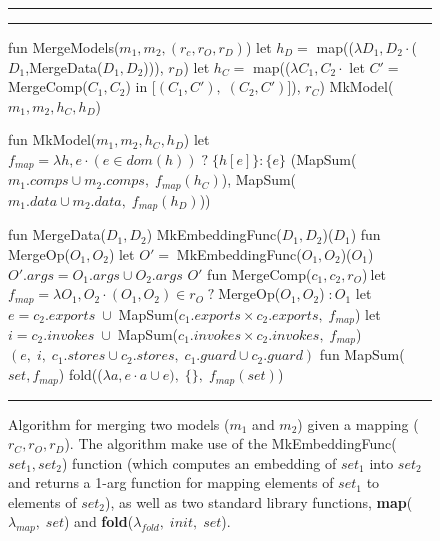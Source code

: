 
\begin{figure}[ht]
\hrule\hrule
\centering
  \begin{slangmath}[numbers=left,emph={MergeModels, MkMap, MkModel,%
                    MergeData, MergeComp, MergeOp, MapSum}]
fun MergeModels($m_1, m_2, (r_c,r_O,r_D)$)
  let $h_D=$ map(($\lambda D_1,D_2 \cdot$($D_1$,MergeData($D_1, D_2$))), $r_D$)
  let $h_C=$ map(($\lambda C_1,C_2 \cdot$ let $C' =\; $MergeComp($C_1, C_2$) in [$(C_1, C'),\; (C_2, C')$]), $r_C$)
  MkModel($m_1, m_2, h_C, h_D$)

fun MkModel($m_1, m_2, h_C, h_D$)
  let $f_{map} = \lambda h,e \cdot (e \in dom(h)) \;?\; \{h[e]\} : \{e\}$
  (MapSum($m_1.comps \cup m_2.comps,\; f_{map}(h_C)$), MapSum($m_1.data \cup m_2.data,\; f_{map}(h_D)$))

fun MergeData($D_1, D_2$)       \eqv MkEmbeddingFunc($D_1, D_2$)($D_1$)
fun MergeOp($O_1, O_2$)         \eqv let $O'=\; $MkEmbeddingFunc($O_1, O_2$)($O_1$)
                        $O'.args= O_1.args \cup O_2.args$ 
                        $O'$
fun MergeComp($c_1, c_2, r_O$)$\:$\eqv let $f_{map} = \lambda O_1,O_2 \cdot (O_1,O_2)\in r_O\;?\;$MergeOp($O_1,O_2$)$\;: O_1$
                        let $e = c_2.exports\;\cup\;$MapSum($c_1.exports \times c_2.exports,\; f_{map}$)
                        let $i = c_2.invokes\;\cup\;$MapSum($c_1.invokes \times c_2.invokes,\; f_{map}$)
                        $(e,\; i,\; c_1.stores \cup c_2.stores,\; c_1.guard \cup c_2.guard)$
fun MapSum($set, f_{map}$)          \eqv fold(($\lambda a, e \cdot a \cup e),\; \{\},\; f_{map}(set)$)
  \end{slangmath}
\hrule\vskip7pt
\caption{Algorithm for merging two models ($m_1$ and $m_2$) given a
  mapping ($r_C, r_O, r_D$).  The algorithm make use of the {\rmfamily
    MkEmbeddingFunc($set_1, set_2$)} function (which computes an
  embedding of $set_1$ into $set_2$ and returns a 1-arg function for
  mapping elements of $set_1$ to elements of $set_2$), as well as two
  standard library functions, \textbf{map}($\lambda_{map},\; set$) and
  \textbf{fold}($\lambda_{fold},\; init,\; set$).}
\label{fig-mergingin-alg-func}
\end{figure}
